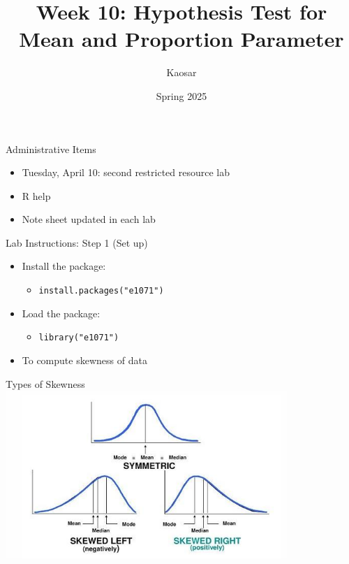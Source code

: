 \documentclass{beamer}
\title{Week 10:  Hypothesis Test for Mean and Proportion Parameter}
\author{Kaosar}
\institute{Auburn University}
\date{Spring 2025}
\begin{document}
\begin{frame}
\titlepage
\end{frame}


\begin{frame}{Administrative Items}
\begin{itemize}
    \item Tuesday, April 10: second restricted resource lab
    \item R help
    \item Note sheet updated in each lab
\end{itemize}
\end{frame}






\begin{frame}{Lab Instructions: Step 1 (Set up)}
\begin{itemize}
    \item Install the package:
    \begin{itemize}
        \item \texttt{install.packages("e1071")}
    \end{itemize}
    \item Load the package:
    \begin{itemize}
        \item \texttt{library("e1071")}
    \end{itemize}
    \item To compute skewness of data
\end{itemize}
\end{frame}

\begin{frame}{Types of Skewness}
    \centering
    \includegraphics[width=0.8\textwidth]{3611_p9.png}
\end{frame}
\end{document}
